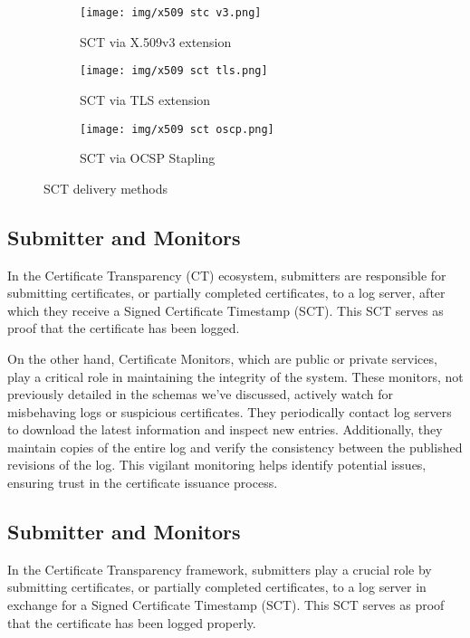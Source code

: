 \begin{figure}[H]
  \centering
  \begin{subfigure}[b]{0.2\textwidth}
    \texttt{[image: img/x509 stc v3.png]}
    \caption{SCT via X.509v3 extension}
    \label{fig:ct x509}
  \end{subfigure}
  \hfill
  \begin{subfigure}[b]{0.3\textwidth}
    \texttt{[image: img/x509 sct tls.png]}
    \caption{SCT via TLS extension}
    \label{fig:ct tls}
  \end{subfigure}
  \hfill
  \begin{subfigure}[b]{0.3\textwidth}
    \texttt{[image: img/x509 sct oscp.png]}
    \caption{SCT via OCSP Stapling}
    \label{fig:ct ocsp}
  \end{subfigure}
  \caption{SCT delivery methods}
  \label{fig:ct delivery}
\end{figure}

\subsection{Submitter and Monitors}

In the Certificate Transparency (CT) ecosystem, submitters are
responsible for submitting certificates, or partially completed
certificates, to a log server, after which they receive a Signed
Certificate Timestamp (SCT). This SCT serves as proof that the
certificate has been logged. 

On the other hand, Certificate Monitors, which are public or private
services, play a critical role in maintaining the integrity of the
system. These monitors, not previously detailed in the schemas we've
discussed, actively watch for misbehaving logs or suspicious
certificates. They periodically contact log servers to download the
latest information and inspect new entries. Additionally, they
maintain copies of the entire log and verify the consistency between
the published revisions of the log. This vigilant monitoring helps
identify potential issues, ensuring trust in the certificate issuance
process.

\subsection{ Submitter and Monitors}

In the Certificate Transparency framework, submitters play a crucial
role by submitting certificates, or partially completed certificates,
to a log server in exchange for a Signed Certificate Timestamp (SCT).
This SCT serves as proof that the certificate has been logged
properly.

